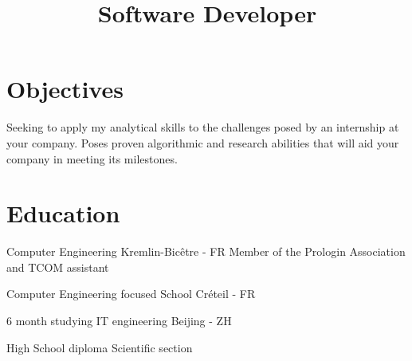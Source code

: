 \documentclass[10pt,a4paper,sans]{moderncv}
\title{Software Developer}
\newcommand\en[1]{#1}
\newcommand\fr[1]{}
\newcommand\full[1]{}
\begin{document}
\makecvtitle
\vspace*{-10mm}

\section{\fr{Objectifs}\en{Objectives}}
\fr{
    Actuellement en dernière année d'école d'ingénieur en informatique à
    l'EPITA.
    Je cherche un stage de 6 mois pour valoriser mon parcours ingénieur. Mon
    stage commencera en Février 2021.
    \full{
        Je cherche à appliquer mes compétences analytiques aux défis proposés
        par un stage dans votre entreprise.
        Mes capacités en Algorithmique et en recherche permettront à votre
        organisation d'atteindre ses objectifs.
    }
}
\en{
    Seeking to apply my analytical skills to the challenges posed by an
    internship at your company. Poses proven algorithmic and research abilities
    that will aid your company in meeting its milestones.
}

\section{\fr{\'Education}\en{Education}}
{\fr{\'Ecole d'ingénieur en informatique}\en{Computer Engineering}}
{Kremlin-Bicêtre - FR}
{\fr{Membre Prologin et Assistant TCOM}\en{Member of the Prologin Association and TCOM assistant}}{}

\full{\cventry{2020}{Huawei}
{\fr{Formation des les équipements et sur eNSP}\en{Training about equipments and eNSP}}
{Visio conference}
{}{}}

{\fr{Université d'informatique}\en{Computer Engineering focused School}}
{Créteil - FR}
{\fr{Licence d'informatique}}{}

\full{\cventry{2018}{Google}{Q{\&}A Meeting with an Google Software Engineer.}
{FR}{}{}}

{\fr{6 mois d'étude informatique}\en{6 month studying IT engineering}}
{\fr{Pékin}\en{Beijing} - ZH}{}{}

\full{\cventry{2014}{BNSSA et PSE1}{\fr{Surveillant de baignade}\en{lifeguard}}{}{}{}}

{\fr{Baccalauréat}\en{High School diploma}}
{\fr{Série Scientifique}\en{Scientific section}}{}
{}{}
\end{document}
